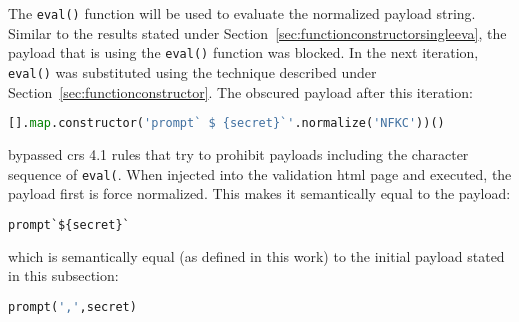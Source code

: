 The \verb|eval()| function will be used to evaluate the normalized payload string. Similar to the results stated under Section~\ref{sec:functionconstructorsingleeva}, the payload that is using the \verb|eval()| function was blocked. In the next iteration, \verb|eval()| was substituted using the technique described under Section~\ref{sec:functionconstructor}. The obscured payload after this iteration:

\begin{lstlisting}[style=basicStyle, language=Python, caption=Forced Unicode Normalization bypass, label={lst:forcedunicodenormbypass}]
[].map.constructor('prompt` $ {secret}`'.normalize('NFKC'))()
\end{lstlisting}

bypassed \acrshort{crs} 4.1 rules that try to prohibit payloads including the character sequence of \verb|eval(|. When injected into the validation \acrshort{html} page and executed, the payload first is force normalized. This makes it semantically equal to the payload:

\begin{lstlisting}[style=basicStyle, language=Python]
prompt`${secret}`
\end{lstlisting}

which is semantically equal (as defined in this work) to the initial payload stated in this subsection:

\begin{lstlisting}[style=basicStyle, language=Python]
prompt(',',secret)
\end{lstlisting}


%
%
%


